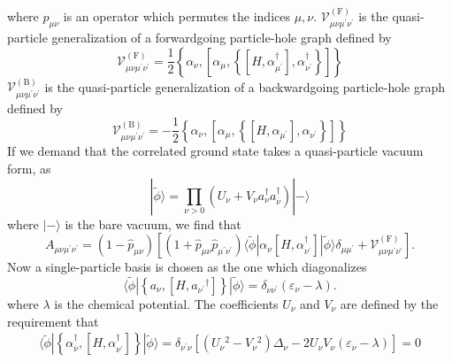 where $\hat{p}_{\mu \nu}$ is an operator which permutes the indices $\mu, \nu$. $ \mathcal{V}_{\mu \nu \mu^{\prime} \nu^{\prime}}^{(\mathrm{F})}$ is the quasi-particle generalization of a forwardgoing particle-hole graph defined by
\begin{equation}
    \mathcal{V}_{\mu \nu \mu^{\prime} \nu^{\prime}}^{(\mathrm{F})}=\frac{1}{2}\left\{\alpha_\nu,\left[\alpha_\mu,\left\{\left[H, \alpha_{\mu^{\prime}}^{\dagger}\right], \alpha_{\nu^{\prime}}^{\dagger}\right\}\right]\right\}
\end{equation}
$\mathcal{V}_{\mu \nu \mu^{\prime} \nu^{\prime}}^{(\mathrm{B})}$ is the quasi-particle generalization of a backwardgoing particle-hole graph defined by
\begin{equation}
    \mathcal{V}_{\mu \nu \mu^{\prime} \nu^{\prime}}^{(\mathrm{B})}=-\frac{1}{2}\left\{\alpha_\nu,\left[\alpha_\mu,\left\{\left[H, \alpha_{\mu^{\prime}}\right], \alpha_{\nu^{\prime}}\right\}\right]\right\}
\end{equation}
If we demand that the correlated ground state takes a quasi-particle vacuum form, as
\begin{equation}
|\tilde{\phi}\rangle=\prod_{\nu>0}\left(U_\nu+V_\nu a_\nu^{\dagger} a_{\overline{\nu}}^{\dagger}\right)|-\rangle
\end{equation}
where $|-\rangle$ is the bare vacuum, we find that
\begin{equation}
    A_{\mu \nu \mu^{\prime} \nu^{\prime}}=\left(1-\hat{p}_{\mu \nu}\right)\left[\left(1+\hat{p}_{\mu \nu} \hat{p}_{\mu^{\prime} \nu^{\prime}}\right)\langle  \tilde{\phi}| \alpha_\nu\left[H, \alpha_{\nu^{\prime}}^{\dagger}\right]| \tilde{\phi}\rangle \delta_{\mu \mu^{\prime}}+\mathcal{V}_{\mu \nu \mu^{\prime} \nu^{\prime}}^{(\mathrm{F})}\right] .
\end{equation}
Now a single-particle basis is chosen as the one which diagonalizes
\begin{equation}
\langle \tilde{\phi}|\left\{a_\nu,\left[H, a_{\nu^{\prime}}{ }^{\dagger}\right]\right\}|\tilde{\phi}\rangle=\delta_{\nu \nu^{\prime}}\left(\varepsilon_\nu-\lambda\right) .
\end{equation}
where $\lambda$ is the chemical potential.
The coefficients $U_\nu$ and $V_\nu$ are defined by the requirement that
\begin{align}
    \langle \tilde{\phi}|\left\{\alpha_{\bar{\nu}}^{\dagger},\left[H, \alpha_{\nu^{\prime}}^{\dagger}\right]\right\}|\tilde{\phi}\rangle = \delta_{\nu^{\prime} \nu}\left[\left(U_\nu{ }^2-V_\nu{ }^2\right)\Delta _\nu-2 U_\nu V_\nu\left(\varepsilon_\nu-\lambda\right)\right] = 0 
\end{align}
